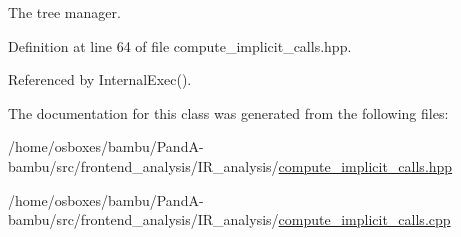 The tree manager. 



Definition at line 64 of file compute\+\_\+implicit\+\_\+calls.\+hpp.



Referenced by Internal\+Exec().



The documentation for this class was generated from the following files\+:\begin{DoxyCompactItemize}
\item 
/home/osboxes/bambu/\+Pand\+A-\/bambu/src/frontend\+\_\+analysis/\+I\+R\+\_\+analysis/\hyperlink{compute__implicit__calls_8hpp}{compute\+\_\+implicit\+\_\+calls.\+hpp}\item 
/home/osboxes/bambu/\+Pand\+A-\/bambu/src/frontend\+\_\+analysis/\+I\+R\+\_\+analysis/\hyperlink{compute__implicit__calls_8cpp}{compute\+\_\+implicit\+\_\+calls.\+cpp}\end{DoxyCompactItemize}
